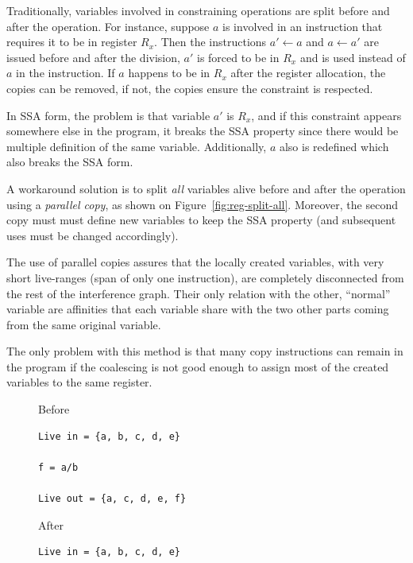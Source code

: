 {Traditionally, variables involved in constraining operations are split before and after the operation.
For instance, suppose $a$ is involved in an instruction that requires it to be in register $R_x$.
Then the instructions $a'\gets a$ and $a\gets a'$ are issued before and after the division,
$a'$ is forced to be in $R_x$ and is used instead of $a$ in the instruction.
If $a$ happens to be in $R_x$ after the register allocation, the copies can be removed, if not, the copies ensure the constraint is respected.

In SSA form, the problem is that variable $a'$ is $R_x$, and if this constraint appears somewhere else in the program, it breaks the SSA property since there would be multiple definition of the same variable.
Additionally, $a$ also is redefined which also breaks the SSA form.

A workaround solution is to split \emph{all} variables alive before and 
after the operation using a \emph{parallel copy}, as shown on Figure~\ref{fig:reg-split-all}.
Moreover, the second copy must must define new variables to keep the SSA property (and subsequent uses must be changed accordingly).

The use of parallel copies assures that the locally created variables, with very short live-ranges (span of only one instruction), are completely disconnected from the rest of the interference graph.
Their only relation with the other, ``normal'' variable are affinities that each 
variable share with the two other parts coming from the same original variable.

The only problem with this method is that many copy instructions can remain in the program if the coalescing is not good enough to assign most of the created variables to the same register.  

\begin{figure}
  \begin{minipage}{.39\textwidth}
  \begin{center}
    Before
      \begin{verbatim}
Live in = {a, b, c, d, e}

f = a/b

Live out = {a, c, d, e, f}

      \end{verbatim}
  \end{center}
  \end{minipage}
  \begin{minipage}{.6\textwidth}
  \begin{center}
    After
      \begin{verbatim}
Live in = {a, b, c, d, e}


\end{verbatim}
\end{center}
\end{minipage}
\end{figure}}
